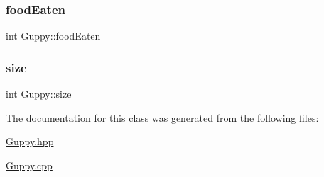 \subsubsection{\texorpdfstring{food\+Eaten}{foodEaten}}
{\footnotesize\ttfamily int Guppy\+::food\+Eaten\hspace{0.3cm}{\ttfamily [private]}}

\mbox{\label{class_guppy_af72ab3a1333652d6568daab2364f8667}} 
\subsubsection{\texorpdfstring{size}{size}}
{\footnotesize\ttfamily int Guppy\+::size\hspace{0.3cm}{\ttfamily [private]}}



The documentation for this class was generated from the following files\+:\begin{DoxyCompactItemize}
\item 
\mbox{\hyperlink{_guppy_8hpp}{Guppy.\+hpp}}\item 
\mbox{\hyperlink{_guppy_8cpp}{Guppy.\+cpp}}\end{DoxyCompactItemize}
